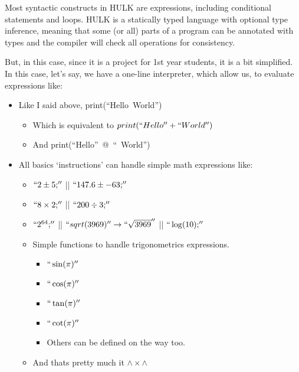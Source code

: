     Most syntactic constructs in HULK are expressions, including conditional statements and loops. HULK is a statically typed language with optional type inference, meaning that some (or all) parts of a program can be annotated with types and the compiler will check all operations for consistency.

     But, in this case, since it is a project for 1st year students, it is a bit simplified.
     In this case, let's say, we have a one-line interpreter, which allow us, to evaluate expressions like:
     \begin{itemize}
        \item Like I said above, \hbox{print(``Hello World'')}
            \begin{itemize}
                \item Which is equivalent to \hbox{$print(``Hello'' + `` World'')$}
                \item And \hbox{print(``Hello'' @ `` World'')}
            \end{itemize}
        \item All basics `instructions' can handle simple math expressions like:
            \begin{itemize}
                \item $``2 \pm  5;''$ || $``147.6 \pm  -63;''$
                \item $``8 \times  2;''$ || $``200 \div 3;''$
                \item $``2^{64};''$ || $``sqrt(3969)'' \rightarrow  ``\sqrt{3969}''$ || $``\log({ 10});''$
                \item Simple functions to handle trigonometrics expressions.
                    \begin{itemize}
                        \item $``\sin({\pi})''$ 
                        \item $``\cos({\pi})''$
                        \item $``\tan({\pi})''$
                        \item $``\cot({\pi})''$
                        \item Others can be defined on the way too.
                    \end{itemize}
                \item And thats pretty much it $\land\times \land$ 
            \end{itemize}
     \end{itemize}